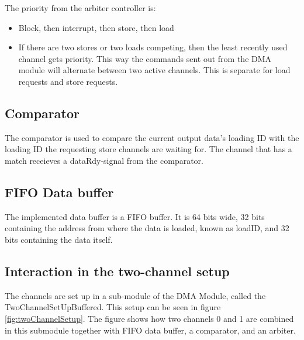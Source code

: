 \begin{appendix}
The priority from the arbiter controller is:
\begin{itemize}
    \item Block, then interrupt, then store, then load
    \item If there are two stores or two loads competing, then the least recently used channel gets priority.
    This way the commands sent out from the DMA module will alternate between two active channels. 
    This is separate for load requests and store requests.
\end{itemize}

\subsection{Comparator}
The comparator is used to compare the current output data's loading ID with the loading ID the requesting store channels are waiting for.
The channel that has a match receieves a dataRdy-signal from the comparator. 

\subsection{FIFO Data buffer}
The implemented data buffer is a FIFO buffer.
It is 64 bits wide, 32 bits containing the address from where the data is loaded, known as loadID, and 32 bits containing the data itself.

\subsection{Interaction in the two-channel setup}
The channels are set up in a sub-module of the DMA Module, called the TwoChannelSetUpBuffered.
This setup can be seen in figure \ref{fig:twoChannelSetup}.
The figure shows how two channels 0 and 1 are combined in this submodule together with FIFO data buffer, a comparator, and an arbiter.


\end{appendix}

